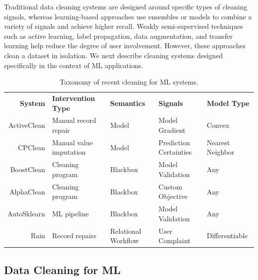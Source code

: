 \documentclass[11pt,dvipsnames]{article}
\begin{document}
Traditional data cleaning systems are designed around specific types of cleaning signals, whereas learning-based approaches use ensembles or models to combine a variety of signals and achieve higher recall. Weakly semi-supervised techniques such as active learning, label propagation, data augmentation, and transfer learning help reduce the degree of user involvement.  However, these approaches clean a dataset in isolation.  We next describe cleaning systems designed specifically in the context of ML applications.



\begin{table}
\smallestfont
\centering
\caption{Taxonomy of recent cleaning for ML systems.}
\label{tab:taxonomy}
\begin{tabular}{r l l l l}
  \textbf{System}      & \textbf{Intervention Type} & \textbf{Semantics} & \textbf{Signals} & \textbf{Model Type} \\ 
ActiveClean & Manual record repair  & Model & Model Gradient  &  Convex \\ 
CPClean     & Manual value imputation & Model    & Prediction Certainties  & Nearest Neighbor \\
BoostClean  & Cleaning program        & Blackbox  & Model Validation  & Any \\
AlphaClean  & Cleaning program        & Blackbox  & Custom Objective  & Any \\
AutoSklearn & ML pipeline             & Blackbox  & Model Validation  & Any \\
Rain        & Record repairs & Relational Workflow  & User Complaint & Differentiable \\
\end{tabular}

\end{table}



\subsection{Data Cleaning for ML}
\label{sec:sota:c4ml}
\end{document}
